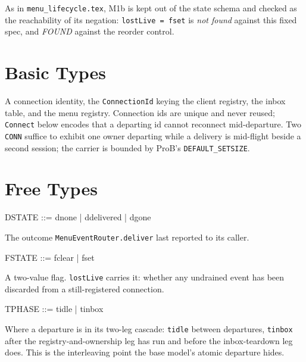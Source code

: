 \documentclass[a4paper,10pt,fleqn]{article}
\begin{document}
As in \texttt{menu\_lifecycle.tex}, M1b is kept out of the state schema and
checked as the reachability of its negation: \texttt{lostLive = fset} is
\emph{not found} against this fixed spec, and \emph{FOUND} against the
reorder control.

\section{Basic Types}

\begin{zed}
  [CONN]
\end{zed}

A connection identity, the \texttt{ConnectionId} keying the client registry,
the inbox table, and the menu registry. Connection ids are unique and never
reused; \texttt{Connect} below encodes that a departing id cannot reconnect
mid-departure. Two \texttt{CONN} suffice to exhibit one owner departing while a
delivery is mid-flight beside a second session; the carrier is bounded by
ProB's \texttt{DEFAULT\_SETSIZE}.

\section{Free Types}

\begin{zed}
  DSTATE ::= dnone | ddelivered | dgone
\end{zed}

The outcome \texttt{MenuEventRouter.deliver} last reported to its caller.

\begin{zed}
  FSTATE ::= fclear | fset
\end{zed}

A two-value flag. \texttt{lostLive} carries it: whether any undrained event has
been discarded from a still-registered connection.

\begin{zed}
  TPHASE ::= tidle | tinbox
\end{zed}

Where a departure is in its two-leg cascade: \texttt{tidle} between departures,
\texttt{tinbox} after the registry-and-ownership leg has run and before the
inbox-teardown leg does. This is the interleaving point the base model's atomic
departure hides.
\end{document}
